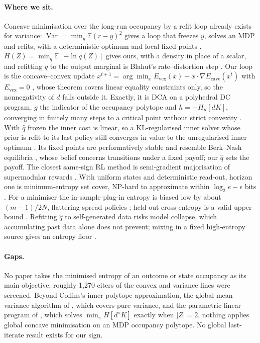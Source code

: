 \documentclass[10pt]{article}
\newcommand{\Hmu}{H_\mu}
\newcommand{\dpi}{d^\pi}
\begin{document}
\paragraph{Where we sit.}
Concave minimisation over the long-run occupancy by a refit loop already exists for variance: $\operatorname{Var}=\min_y \mathbb{E}(r-y)^2$ gives a loop that freezes $y$, solves an MDP and refits, with a deterministic optimum and local fixed points \citep{Xia-optimization16}. $H(Z)=\min_q \mathbb{E}[-\ln q(Z)]$ gives ours, with a density in place of a scalar, and refitting $q$ to the output marginal is Blahut's rate--distortion step \citep[Thm.~4]{Blahut-computation72}. Our loop is the concave--convex update $x^{t+1}=\arg\min_x E_{\mathrm{vex}}(x)+x\cdot\nabla E_{\mathrm{cave}}(x^t)$ with $E_{\mathrm{vex}}=0$ \citep[Thm.~3]{Yuille-concaveconvex03}, whose theorem covers linear equality constraints only, so the nonnegativity of $d$ falls outside it. Exactly, it is DCA on a polyhedral DC program, $g$ the indicator of the occupancy polytope and $h=-\Hmu[dK]$, converging in finitely many steps to a critical point without strict convexity \citep{LeThi-dc18}. With $\hat q$ frozen the inner cost is linear, so a KL-regularised inner solver whose prior is refit to its last policy still converges in value to the unregularised inner optimum \citep[Thm.~4]{Rawlik-stochastic12}. Its fixed points are performatively stable \citep{Perdomo-performative20} and resemble Berk--Nash equilibria \citep{Esponda-equilibrium21}, whose belief concerns transitions under a fixed payoff; our $\hat q$ sets the payoff. The closest same-sign RL method is semi-gradient majorisation of supermodular rewards \citep{DeSanti-global24}. With uniform states and deterministic read-out, horizon one is minimum-entropy set cover, NP-hard to approximate within $\log_2 e-\epsilon$ bits \citep[Thm.~1]{Cardinal-minimum10}. For a minimiser the in-sample plug-in entropy is biased low by about $(m-1)/2N$, flattering spread policies \citep{Paninski-estimation03}; held-out cross-entropy is a valid upper bound \citep{McAllester-formal20}. Refitting $\hat q$ to self-generated data risks model collapse, which accumulating past data alone does not prevent; mixing in a fixed high-entropy source gives an entropy floor \citep{Barzilai-when25,Chen-entropyreservoir25}.

\paragraph{Gaps.}
No paper takes the minimised entropy of an outcome or state occupancy as its main objective; roughly 1{,}270 citers of the convex and variance lines were screened. Beyond Collins's inner polytope approximation, the global mean-variance algorithm of \citet{Xia-global26}, which covers pure variance, and the parametric linear program of \citet{Huang-finding94}, which solves $\min_\pi H[\dpi K]$ exactly when $|Z|=2$, nothing applies global concave minimisation on an MDP occupancy polytope. No global last-iterate result exists for our sign.
\end{document}
